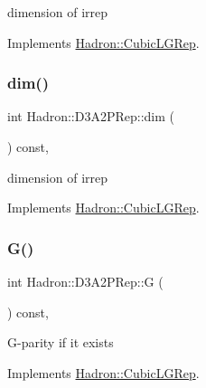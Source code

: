 dimension of irrep 

Implements \mbox{\hyperlink{structHadron_1_1CubicLGRep_a3acbaea26503ed64f20df693a48e4cdd}{Hadron\+::\+Cubic\+L\+G\+Rep}}.

\mbox{\label{structHadron_1_1D3A2PRep_a0cd24db04dc4889f2a1014f97efb41fc}} 
\subsubsection{\texorpdfstring{dim()}{dim()}\hspace{0.1cm}{\footnotesize\ttfamily [2/2]}}
{\footnotesize\ttfamily int Hadron\+::\+D3\+A2\+P\+Rep\+::dim (\begin{DoxyParamCaption}{ }\end{DoxyParamCaption}) const\hspace{0.3cm}{\ttfamily [inline]}, {\ttfamily [virtual]}}

dimension of irrep 

Implements \mbox{\hyperlink{structHadron_1_1CubicLGRep_a3acbaea26503ed64f20df693a48e4cdd}{Hadron\+::\+Cubic\+L\+G\+Rep}}.

\mbox{\label{structHadron_1_1D3A2PRep_a66a258648b3e253504417736d0c454a8}} 
\subsubsection{\texorpdfstring{G()}{G()}\hspace{0.1cm}{\footnotesize\ttfamily [1/2]}}
{\footnotesize\ttfamily int Hadron\+::\+D3\+A2\+P\+Rep\+::G (\begin{DoxyParamCaption}{ }\end{DoxyParamCaption}) const\hspace{0.3cm}{\ttfamily [inline]}, {\ttfamily [virtual]}}

G-\/parity if it exists 

Implements \mbox{\hyperlink{structHadron_1_1CubicLGRep_ace26f7b2d55e3a668a14cb9026da5231}{Hadron\+::\+Cubic\+L\+G\+Rep}}.

\mbox{\label{structHadron_1_1D3A2PRep_a66a258648b3e253504417736d0c454a8}} 
